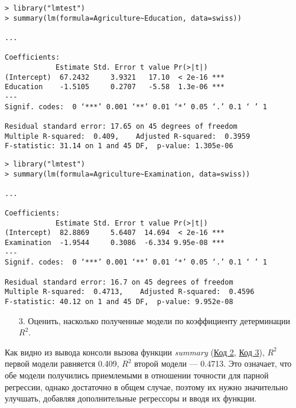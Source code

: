 \begin{code}
\begin{verbatim}
> library("lmtest")
> summary(lm(formula=Agriculture~Education, data=swiss))

...

Coefficients:
            Estimate Std. Error t value Pr(>|t|)    
(Intercept)  67.2432     3.9321   17.10  < 2e-16 ***
Education    -1.5105     0.2707   -5.58  1.3e-06 ***
---
Signif. codes:  0 ‘***’ 0.001 ‘**’ 0.01 ‘*’ 0.05 ‘.’ 0.1 ‘ ’ 1

Residual standard error: 17.65 on 45 degrees of freedom
Multiple R-squared:  0.409,    Adjusted R-squared:  0.3959 
F-statistic: 31.14 on 1 and 45 DF,  p-value: 1.305e-06
\end{verbatim}
\label{code:2}
\end{code}

\begin{code}
\begin{verbatim}
> library("lmtest")
> summary(lm(formula=Agriculture~Examination, data=swiss))

...

Coefficients:
            Estimate Std. Error t value Pr(>|t|)    
(Intercept)  82.8869     5.6407  14.694  < 2e-16 ***
Examination  -1.9544     0.3086  -6.334 9.95e-08 ***
---
Signif. codes:  0 ‘***’ 0.001 ‘**’ 0.01 ‘*’ 0.05 ‘.’ 0.1 ‘ ’ 1

Residual standard error: 16.7 on 45 degrees of freedom
Multiple R-squared:  0.4713,    Adjusted R-squared:  0.4596 
F-statistic: 40.12 on 1 and 45 DF,  p-value: 9.952e-08
\end{verbatim}
\label{code:3}
\end{code}

\begin{enumerate}
    \item[3.] Оценить, насколько  полученные модели по коэффициенту детерминации $R^2$.
\end{enumerate}

Как видно из вывода консоли вызова функции \textit{summary} (\hyperref[code:2]{Код 2}, \hyperref[code:3]{Код 3}), $R^2$ первой модели равняется 0.409, $R^2$ второй модели --- 0.4713. Это означает, что обе модели получились приемлемыми в отношении точности для парной регрессии, однако достаточно  в общем случае, поэтому их нужно значительно улучшать, добавляя дополнительные регрессоры и вводя их функции.

